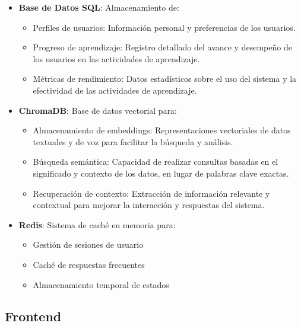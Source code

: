 \begin{itemize}
	\item \textbf{Base de Datos SQL}: Almacenamiento de:
	      \begin{itemize}
		      \item Perfiles de usuarios: Información personal y preferencias de los usuarios.
		      \item Progreso de aprendizaje: Registro detallado del avance y desempeño de los usuarios en las actividades de aprendizaje.
		      \item Métricas de rendimiento: Datos estadísticos sobre el uso del sistema y la efectividad de las actividades de aprendizaje.
	      \end{itemize}

	\item \textbf{ChromaDB}: Base de datos vectorial para:
	      \begin{itemize}
		      \item Almacenamiento de embeddings: Representaciones vectoriales de datos textuales y de voz para facilitar la búsqueda y análisis.
		      \item Búsqueda semántica: Capacidad de realizar consultas basadas en el significado y contexto de los datos, en lugar de palabras clave exactas.
		      \item Recuperación de contexto: Extracción de información relevante y contextual para mejorar la interacción y respuestas del sistema.
	      \end{itemize}

	\item \textbf{Redis}: Sistema de caché en memoria para:
	      \begin{itemize}
		      \item Gestión de sesiones de usuario
		      \item Caché de respuestas frecuentes
		      \item Almacenamiento temporal de estados
	      \end{itemize}
\end{itemize}

\subsection{Frontend}

